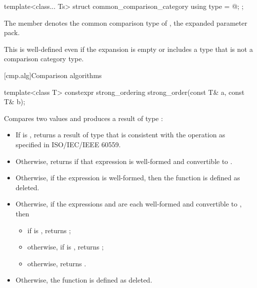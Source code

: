 %
\begin{itemdecl}
template<class... Ts>
struct common_comparison_category {
  using type = @\seebelow@;
};
\end{itemdecl}

\begin{itemdescr}
\pnum
\remarks
The member   denotes
the common comparison type of ,
the expanded parameter pack.
\begin{note}
This is well-defined even if
the expansion is empty or
includes a type that is not a comparison category type.
\end{note}
\end{itemdescr}

[cmp.alg]{Comparison algorithms}

%
\begin{itemdecl}
template<class T> constexpr strong_ordering strong_order(const T& a, const T& b);
\end{itemdecl}

\begin{itemdescr}
\pnum
\effects
Compares two values and produces a result of type :

\begin{itemize}
\item
If  is ,
returns a result of type 
that is consistent with the  operation
as specified in ISO/IEC/IEEE 60559.
\item
Otherwise, returns 
if that expression is well-formed and
convertible to .
\item
Otherwise, if the expression  is well-formed,
then the function is defined as deleted.
\item
Otherwise, if the expressions  and 
are each well-formed and convertible to , then
\begin{itemize}
\item
if  is ,
returns ;
\item
otherwise, if  is ,
returns ;
\item
otherwise,
returns .
\end{itemize}
\item
Otherwise, the function is defined as deleted.
\end{itemize}
\end{itemdescr}

